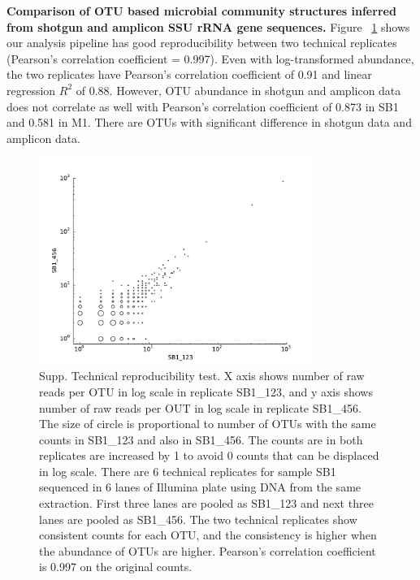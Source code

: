 \documentclass[12pt]{article}
\begin{document}
{\bf Comparison of OTU based microbial community structures inferred
from shotgun and amplicon SSU rRNA gene sequences. } Figure
~\ref{fig:SB1_techrep_OTUscat} shows our analysis pipeline has good
reproducibility between two technical replicates (Pearson’s
correlation coefficient = 0.997). Even with log-transformed abundance,
the two replicates have Pearson’s correlation coefficient of 0.91 and
linear regression $R^2$ of 0.88. However, OTU abundance in shotgun and
amplicon data does not correlate as well with Pearson’s correlation
coefficient of 0.873 in SB1 and 0.581 in M1. There are OTUs with
significant difference in shotgun data and amplicon data.

\begin{figure}[tbph!]
  \centering
  \includegraphics[width=0.8\textwidth]{figs/SB1_techrep_OTUscat}

  \caption[Technical reproducibility test]{Supp. Technical
  reproducibility test. X axis shows number of raw reads per OTU in
  log scale in replicate SB1\_123, and y axis shows number of raw
  reads per OUT in log scale in replicate SB1\_456. The size of circle
  is proportional to number of OTUs with the same counts in SB1\_123
  and also in SB1\_456. The counts are in both replicates are
  increased by 1 to avoid 0 counts that can be displaced in log
  scale. There are 6 technical replicates for sample SB1 sequenced in
  6 lanes of Illumina plate using DNA from the same extraction. First
  three lanes are pooled as SB1\_123 and next three lanes are pooled
  as SB1\_456. The two technical replicates show consistent counts for
  each OTU, and the consistency is higher when the abundance of OTUs
  are higher. Pearson’s correlation coefficient is 0.997 on the
  original counts.}

  \label{fig:SB1_techrep_OTUscat}
\end{figure}
\end{document}
